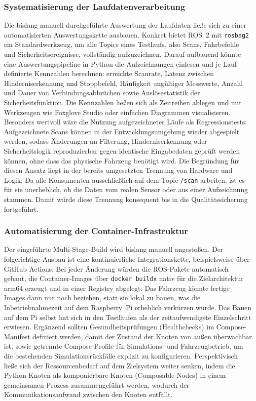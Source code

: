 \subsubsection{Systematisierung der Laufdatenverarbeitung}
Die bislang manuell durchgeführte Auswertung der Laufdaten ließe sich zu einer automatisierten Auswertungskette ausbauen. Konkret bietet ROS~2 mit \texttt{rosbag2} ein Standardwerkzeug, um alle Topics eines Testlaufs, also Scans, Fahrbefehle und Sicherheitsereignisse, vollständig aufzuzeichnen. Darauf aufbauend könnte eine Auswertungspipeline in Python die Aufzeichnungen einlesen und je Lauf definierte Kennzahlen berechnen: erreichte Scanrate, Latenz zwischen Hinderniserkennung und Stoppbefehl, Häufigkeit ungültiger Messwerte, Anzahl und Dauer von Verbindungsabbrüchen sowie Auslösestatistik der Sicherheitsfunktion. Die Kennzahlen ließen sich als Zeitreihen ablegen und mit Werkzeugen wie Foxglove Studio oder einfachen Diagrammen visualisieren.
\\
Besonders wertvoll wäre die Nutzung aufgezeichneter Läufe als Regressionstests: Aufgezeichnete Scans können in der Entwicklungsumgebung wieder abgespielt werden, sodass Änderungen an Filterung, Hinderniserkennung oder Sicherheitslogik reproduzierbar gegen identische Eingabedaten geprüft werden können, ohne dass das physische Fahrzeug benötigt wird. Die Begründung für diesen Ansatz liegt in der bereits umgesetzten Trennung von Hardware und Logik: Da alle Konsumenten ausschließlich auf dem Topic \texttt{/scan} arbeiten, ist es für sie unerheblich, ob die Daten vom realen Sensor oder aus einer Aufzeichnung stammen. Damit würde diese Trennung konsequent bis in die Qualitätssicherung fortgeführt.

\subsubsection{Automatisierung der Container-Infrastruktur}
Der eingeführte Multi-Stage-Build wird bislang manuell angestoßen. Der folgerichtige Ausbau ist eine kontinuierliche Integrationskette, beispielsweise über GitHub Actions: Bei jeder Änderung würden die ROS-Pakete automatisch gebaut, die Container-Images über \texttt{docker buildx} nativ für die Zielarchitektur \gls{arm64} erzeugt und in einer Registry abgelegt. Das Fahrzeug könnte fertige Images dann nur noch beziehen, statt sie lokal zu bauen, was die Inbetriebnahmezeit auf dem Raspberry~Pi erheblich verkürzen würde. Das Bauen auf dem Pi selbst hat sich in den Testläufen als der zeitaufwendigste Einzelschritt erwiesen. Ergänzend sollten Gesundheitsprüfungen (Healthchecks) im Compose-Manifest definiert werden, damit der Zustand der Knoten von außen überwachbar ist, sowie getrennte Compose-Profile für Simulations- und Fahrzeugbetrieb, um die bestehenden Simulationsrückfälle explizit zu konfigurieren. Perspektivisch ließe sich der Ressourcenbedarf auf dem Zielsystem weiter senken, indem die Python-Knoten als komponierbare Knoten (Composable Nodes) in einem gemeinsamen Prozess zusammengeführt werden, wodurch der Kommunikationsaufwand zwischen den Knoten entfällt.

